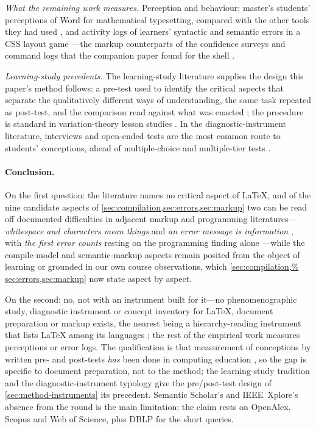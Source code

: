 \emph{What the remaining work measures.}
Perception and behaviour: master's students' perceptions of Word for
mathematical typesetting, compared with the other tools they had used
\autocite{Loch2015WordMaths}, and activity logs of learners' syntactic and
semantic errors in a CSS layout game \autocite{Kim2019CSSLayout}---the
markup counterparts of the confidence surveys and command logs that the
companion paper found for the shell \autocite{VTTerminal}.

\emph{Learning-study precedents.}
The learning-study literature supplies the design this paper's method
follows: a pre-test used to identify the critical aspects that separate
the qualitatively different ways of understanding, the same task repeated
as post-test, and the comparison read against what was enacted
\autocite{PangMarton2005}; the procedure is standard in variation-theory
lesson studies \autocite{Kullberg2017ZDM}.
In the diagnostic-instrument literature, interviews and open-ended tests
are the most common route to students' conceptions, ahead of
multiple-choice and multiple-tier tests
\autocite{KaltakciGurel2015Diagnostics}.

\paragraph{Conclusion.}
On the first question: the literature names no critical aspect of LaTeX,
and of the nine candidate aspects of
\cref{sec:compilation,sec:errors,sec:markup} two can be read off
documented difficulties in adjacent markup and programming
literatures---\emph{whitespace and characters mean things}
\autocite{Park2011WebDev} and \emph{an error message is information}
\autocite{Park2015SyntaxErrors,Park2013ErrorTaxonomy,%
Munson2016CompilerErrors,Prather2017Interaction}, with \emph{the first
error counts} resting on the programming finding alone
\autocite{Munson2016CompilerErrors}---while the compile-model and
semantic-markup aspects remain posited from the object of learning or
grounded in our own course observations, which \cref{sec:compilation,%
sec:errors,sec:markup} now state aspect by aspect.

On the second: no, not with an instrument built for it---no
phenomenographic study, diagnostic instrument or concept inventory for
LaTeX, document preparation or markup exists, the nearest being a
hierarchy-reading instrument that lists LaTeX among its languages
\autocite{Park2016Hierarchies}; the rest of the empirical work measures
perceptions or error logs.
The qualification is that measurement of conceptions by written pre- and
post-tests \emph{has} been done in computing education
\autocite{Pamplona2024VirtualMemory}, so the gap is specific to document
preparation, not to the method; the learning-study tradition
\autocite{PangMarton2005,Kullberg2017ZDM} and the diagnostic-instrument
typology \autocite{KaltakciGurel2015Diagnostics} give the pre/post-test
design of \cref{sec:method-instruments} its precedent.
Semantic Scholar's and IEEE~Xplore's absence from the round is the main
limitation; the claim rests on OpenAlex, Scopus and Web of Science, plus
DBLP for the short queries.
